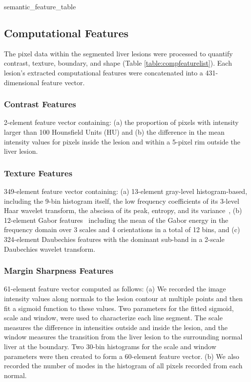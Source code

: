{semantic_feature_table}

\clearpage
\subsection{Computational Features}
The pixel data within the segmented liver lesions were processed to quantify contrast, texture, boundary, and shape (Table \ref{table:compfeaturelist}). Each lesion's extracted computational features were concatenated into a 431-dimensional feature vector.

\subsubsection{Contrast Features}
2-element feature vector containing: (a) the proportion of pixels with intensity larger than 100 Hounsfield Units (HU) and (b) the difference in the mean intensity values for pixels inside the lesion and within a 5-pixel rim outside the liver lesion.

\subsubsection{Texture Features}
349-element feature vector containing: (a) 13-element gray-level histogram-based, including the 9-bin histogram itself, the low frequency coefficients of its 3-level Haar wavelet transform, the abscissa of its peak, entropy, and its variance~\cite{Strela:2002vq}, (b) 12-element Gabor features~\cite{Zhao:2005wb} including the mean of the Gabor energy in the frequency domain over 3 scales and 4 orientations in a total of 12 bins, and (c) 324-element Daubechies features with the dominant sub-band in a 2-scale Daubechies wavelet transform.

\subsubsection{Margin Sharpness Features}
61-element feature vector computed as follows: (a) We recorded the image intensity values along normals to the lesion contour at multiple points and then fit a sigmoid function to these values.  Two parameters for the fitted sigmoid, scale and window, were used to characterize each line segment. The scale measures the difference in intensities outside and inside the lesion, and the window measures the transition from the liver lesion to the surrounding normal liver at the boundary. Two 30-bin histograms for the scale and window parameters were then created to form a 60-element feature vector. (b) We also recorded the number of modes in the histogram of all pixels recorded from each normal.

